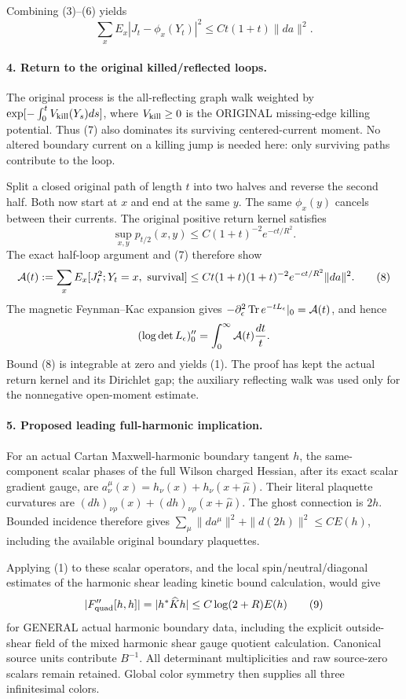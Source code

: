 \documentclass[11pt]{article}
\begin{document}
Combining (3)--(6) yields
\[
 \sum_x E_x|J_t-\phi_x(Y_t)|^2
                         \le Ct(1+t)\|da\|^2.                \tag{7}
\]

\paragraph{4. Return to the original killed/reflected loops.}
The original process is the all-reflecting graph walk weighted by
$\exp[-\int_0^t V_{\rm kill}(Y_s)ds]$, where $V_{\rm kill}\ge0$
is the ORIGINAL missing-edge killing potential.
Thus (7) also dominates its surviving centered-current moment.
No altered boundary current on a killing jump is needed here:
only surviving paths contribute to the loop.

Split a closed original path of length $t$ into two halves and reverse
the second half. Both now start at $x$ and end at the same $y$.
The same $\phi_x(y)$ cancels between their currents.
The original positive return kernel satisfies
\[
 \sup_{x,y}p_{t/2}(x,y)\le
             C(1+t)^{-2}e^{-ct/R^2}.
\]
The exact half-loop argument and (7) therefore show
\[
 {\cal A}(t):=\sum_x E_x[J_t^2;Y_t=x,\ {\rm survival}]
 \le Ct(1+t)(1+t)^{-2}e^{-ct/R^2}\|da\|^2.                    \tag{8}
\]
The magnetic Feynman--Kac expansion gives
$-\partial_\epsilon^2\operatorname{Tr}e^{-tL_\epsilon}|_0
={\cal A}(t)$, and hence
\[
 (\log\det L_\epsilon)''_0=\int_0^\infty {\cal A}(t)\frac{dt}{t}.
\]
Bound (8) is integrable at zero and yields (1).
The proof has kept the actual return kernel and its Dirichlet gap;
the auxiliary reflecting walk was used only for the nonnegative
open-moment estimate.

\paragraph{5. Proposed leading full-harmonic implication.}
For an actual Cartan Maxwell-harmonic boundary tangent $h$, the
same-component scalar phases of the full Wilson charged Hessian,
after its exact scalar gradient gauge, are
$a^\mu_\nu(x)=h_\nu(x)+h_\nu(x+\hat\mu)$.
Their literal plaquette curvatures are
$(dh)_{\nu\rho}(x)+(dh)_{\nu\rho}(x+\hat\mu)$.
The ghost connection is $2h$. Bounded incidence therefore gives
$\sum_\mu\|da^\mu\|^2+\|d(2h)\|^2\le C E(h)$,
including the available original boundary plaquettes.

Applying (1) to these scalar operators, and the
local spin/neutral/diagonal estimates of the harmonic shear leading kinetic bound calculation, would give
\[
 |F_{\rm quad}''[h,h]|=|h^*\widehat K h|
                 \le C\log(2+R)E(h)                         \tag{9}
\]
for GENERAL actual harmonic boundary data, including the explicit
outside-shear field of the mixed harmonic shear gauge quotient calculation. Canonical source units contribute
$B^{-1}$. All determinant multiplicities and raw source-zero scalars
remain retained. Global color symmetry then supplies all three
infinitesimal colors.
\end{document}
